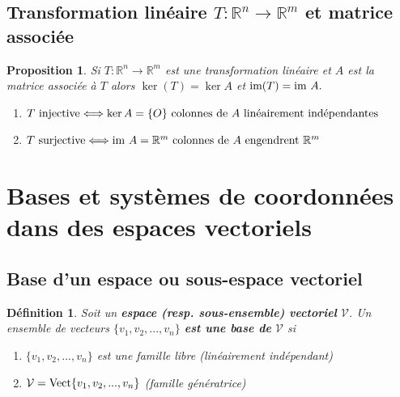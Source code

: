 \documentclass{article}[french, babel]
\newtheorem{mydef}{Définition}
\newtheorem{myprop}{Proposition}
\let\stdsection\section
\renewcommand\section{\newpage\stdsection}
\begin{document}
	\subsection{Transformation linéaire $T : \mathbb{R}^n\longrightarrow\mathbb{R}^m$ et matrice associée}
		\begin{myprop}
			Si $T : \mathbb{R}^n\longrightarrow\mathbb{R}^m$ est une transformation linéaire et $A$ est la matrice associée à $T$ alors $\ker(T)=\ker A$ et $\text{\normalfont{im}}(T)=\text{\normalfont{im}}\ A.$ 
			\begin{enumerate}
				\item $T \text{\normalfont{ injective}} \Longleftrightarrow \ker A=\{O\}\ \text{colonnes de } A \text{ linéairement indépendantes}$
				\item $T \text{\normalfont{ surjective}} \Longleftrightarrow \text{\normalfont{im}}\ A=\mathbb{R}^m\ \text{colonnes de } A \text{ engendrent } \mathbb{R}^m$
			\end{enumerate}
		\end{myprop}
\section{Bases et systèmes de coordonnées dans des espaces vectoriels}
	\subsection{Base d'un espace ou sous-espace vectoriel}
		\begin{mydef}
			Soit un \textbf{espace (resp. sous-ensemble) vectoriel} $\mathcal{V}$.
			Un ensemble de vecteurs $\{v_1,v_2,...,v_n\}$ \textbf{est une base de} $\mathcal{V}$ si
			\begin{enumerate}
				\item  $\{v_1,v_2,...,v_n\}$ est une famille libre (linéairement indépendant)
				\item $\mathcal{V} = \text{\normalfont{Vect}}\{v_1,v_2,...,v_n\}$ (famille génératrice)
			\end{enumerate}
		\end{mydef}
\end{document}
